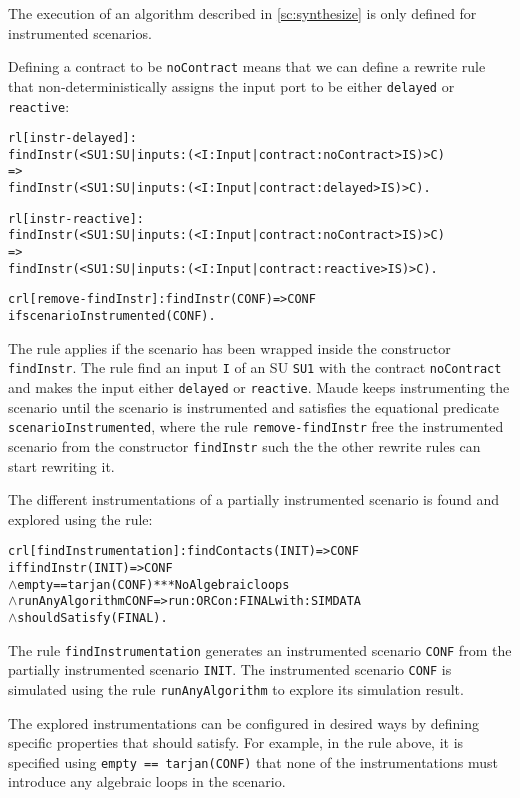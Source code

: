 The execution of an algorithm described in \cref{sc:synthesize} is only defined for instrumented scenarios.

Defining a contract to be \texttt{noContract} means that we can define a rewrite rule that non-deterministically assigns the input port to be either \texttt{delayed} or \texttt{reactive}:
\scriptsize
\begin{alltt}
rl [instr-delayed]: 
  findInstr(< SU1 : SU | inputs : (< I : Input | contract : noContract > IS) > C)
  =>
  findInstr(< SU1 : SU | inputs : (< I : Input | contract : delayed > IS) > C) .

rl [instr-reactive]: 
  findInstr(< SU1 : SU | inputs : (< I : Input | contract :   noContract > IS) > C)
  =>
  findInstr(< SU1 : SU | inputs : (< I : Input | contract : reactive > IS) > C) .

crl [remove-findInstr]: findInstr(CONF) => CONF 
  if scenarioInstrumented(CONF) .
\end{alltt}
\normalsize
The rule applies if the scenario has been wrapped inside the constructor \texttt{findInstr}.
The rule find an input \texttt{I} of an SU \texttt{SU1} with the contract \texttt{noContract} and makes the input either \texttt{delayed} or \texttt{reactive}.
Maude keeps instrumenting the scenario until the scenario is instrumented and satisfies the equational predicate \texttt{scenarioInstrumented}, where the rule \texttt{remove-findInstr} free the instrumented scenario from the constructor \texttt{findInstr} such the the other rewrite rules can start rewriting it.

The different instrumentations of a partially instrumented scenario is found and explored using the rule:

\small
\begin{alltt}
crl [findInstrumentation]: findContacts(INIT) => CONF
    if findInstr(INIT) => CONF
    \(\land\) empty == tarjan(CONF) *** No Algebraic loops
    \(\land\) runAnyAlgorithm CONF => run: ORC on: FINAL with: SIMDATA
    \(\land\) shouldSatisfy(FINAL) .
\end{alltt}
\normalsize
The rule \texttt{findInstrumentation} generates an instrumented scenario \texttt{CONF} from the partially instrumented scenario \texttt{INIT}.
The instrumented scenario \texttt{CONF} is simulated using the rule \texttt{runAnyAlgorithm} to explore its simulation result.

The explored instrumentations can be configured in desired ways by defining specific properties that should satisfy.
For example, in the rule above, it is specified using \texttt{empty == tarjan(CONF)} that none of the instrumentations must introduce any algebraic loops in the scenario.


